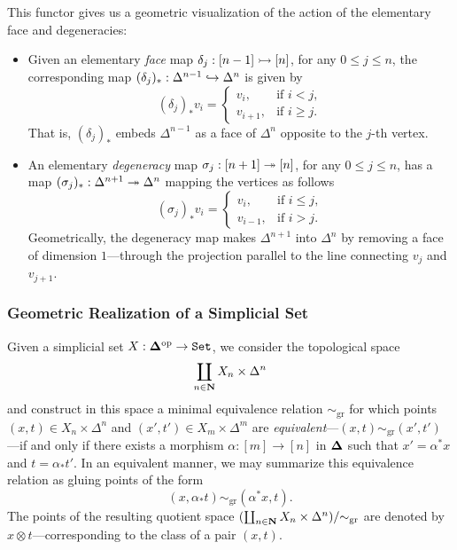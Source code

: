 This functor gives us a geometric visualization of the action of the elementary
face and degeneracies:
\begin{itemize}\setlength\itemsep{0em}
\item Given an elementary \emph{face} map \(\delta_j: [n-1] \rightarrowtail [n]\), for any
  \(0 \leq j \leq n\), the corresponding map
  \((\delta_j)_{*}: \Delta^{n-1} \hookrightarrow \Delta^n\) is given by
  \[
  (\delta_j)_{*} v_i =
  \begin{cases}
    v_i, &\text{if } i < j, \\
    v_{i+1}, &\text{if } i \geq j.
  \end{cases}
  \]
  That is, \((\delta_j)_{*}\) embeds \(\Delta^{n-1}\) as a face of \(\Delta^n\)
  opposite to the \(j\)-th vertex.

\item An elementary \emph{degeneracy} map \(\sigma_j: [n+1] \twoheadrightarrow [n]\), for any
  \(0 \leq j \leq n\), has a map \((\sigma_j)_{*}: \Delta^{n+1} \twoheadrightarrow \Delta^n\)
  mapping the vertices as follows
  \[
  (\sigma_j)_{*} v_i =
  \begin{cases}
    v_i, &\text{if } i \leq j, \\
    v_{i-1}, &\text{if } i > j.
  \end{cases}
  \]
  Geometrically, the degeneracy map makes \(\Delta^{n+1}\) into \(\Delta^n\) by
  removing a face of dimension \(1\)---through the projection parallel to the
  line connecting \(v_j\) and \(v_{j+1}\).
\end{itemize}

\subsubsection{Geometric Realization of a Simplicial Set}

Given a simplicial set \(X: {\mathbf{\Delta}}^{\mathrm{op}} \to {\texttt{Set}}\), we consider the topological
space
\[
\coprod_{n \in \mathbf{N}} X_n \times \Delta^n
\]
and construct in this space a minimal equivalence relation \(\sim_{\text{gr}}\)
for which points \((x, t) \in X_n \times \Delta^n\) and
\((x', t') \in X_m \times \Delta^m\) are
\emph{equivalent}---\((x, t) \sim_{\text{gr}} (x', t')\)---if and only if there
exists a morphism \(\alpha: [m] \to [n]\) in \({\mathbf{\Delta}}\) such that
\(x' = \alpha^{*} x\) and \(t = \alpha_{*} t'\). In an equivalent manner, we may
summarize this equivalence relation as gluing points of the form
\[
(x, \alpha_{*} t) \sim_{\text{gr}} (\alpha^{*} x, t).
\]
The points of the resulting quotient space
\((\coprod_{n \in \mathbf{N}} X_n \times \Delta^n)/{\sim_{\text{gr}}}\) are denoted by
\(x \otimes t\)---corresponding to the class of a pair \((x, t)\).

